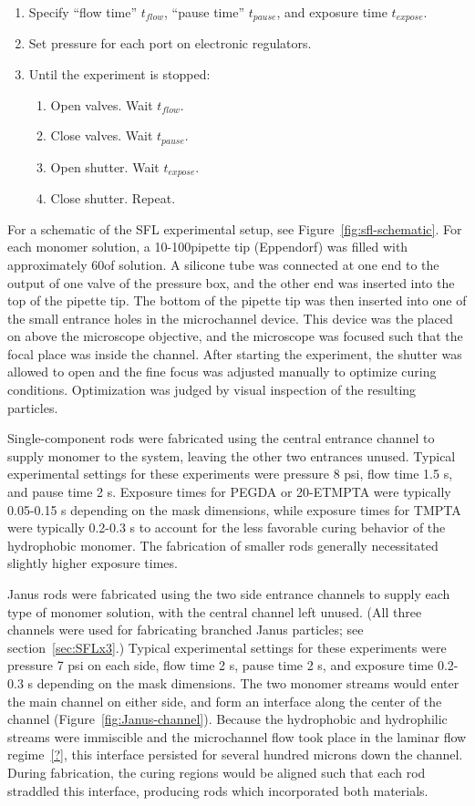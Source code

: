 \begin{enumerate}
\item Specify ``flow time'' $t_{flow}$, ``pause time'' $t_{pause}$, and exposure time $t_{expose}$.
\item Set pressure for each port on electronic regulators.
\item Until the experiment is stopped:
\begin{enumerate}
\item Open valves. Wait $t_{flow}$.
\item Close valves. Wait $t_{pause}$.
\item Open shutter. Wait $t_{expose}$.
\item Close shutter. Repeat.
\end{enumerate}
\end{enumerate}

For a schematic of the SFL experimental setup, see Figure~\ref{fig:sfl-schematic}.
For each monomer solution, a 10-100\uL pipette tip (Eppendorf) was filled with approximately 60\uL of solution.
A silicone tube was connected at one end to the output of one valve of the pressure box, and the other end
was inserted into the top of the pipette tip.  The bottom of the pipette tip was then inserted into one of the
small entrance holes in the microchannel device.  This device was the placed on above the microscope objective,
and the microscope was focused such that the focal place was inside the channel.  After starting the 
experiment, the shutter was allowed to open and the fine focus was adjusted manually to optimize
curing conditions. Optimization was judged by visual inspection of the resulting particles. 

Single-component rods were fabricated using the central entrance channel to supply monomer to the system, 
leaving the other two entrances unused. Typical experimental settings for these experiments were pressure
8 psi, flow time 1.5 s, and pause time 2 s.  Exposure times for PEGDA or 20-ETMPTA were typically 0.05-0.15 s
depending on the mask dimensions, while exposure times for TMPTA were typically 0.2-0.3 s to account for
the less favorable curing behavior of the hydrophobic monomer.  The fabrication of smaller rods generally
necessitated slightly higher exposure times.  

Janus rods were fabricated using the two side entrance channels to supply each type of monomer solution,
with the central channel left unused.  (All three channels were used for fabricating branched Janus particles; see
section~\ref{sec:SFLx3}.)  Typical experimental settings for these experiments were pressure 7 psi on each side, 
flow time 2 s, pause time 2 s, and exposure time 0.2-0.3 s depending on the mask dimensions.
The two monomer streams would enter the main channel on either side, and form
an interface along the center of the channel (Figure~\ref{fig:Janus-channel}). Because the hydrophobic and
hydrophilic streams were immiscible and the microchannel flow took place in the laminar flow regime~\ref{?}, 
this interface persisted for several hundred microns down the channel.
During fabrication, the curing regions would be aligned such that each rod straddled this interface,
producing rods which incorporated both materials.

